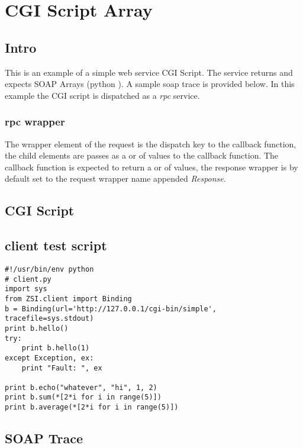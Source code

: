 \chapter{CGI Script Array}

\section{Intro} This is an example of a simple web service CGI Script.  The
service returns and expects SOAP Arrays (python ).  A sample soap
trace is provided below.  In this example the CGI script is dispatched as a
\emph{rpc} service.

\subsection{rpc wrapper} The wrapper element of the request is the dispatch key
to the callback function, the child elements are passes as a  or
 of values to the callback function.  The callback function is
expected to return a  or  of values, the response
wrapper is by default set to the request wrapper name appended \emph{Response}.

\section{CGI Script}



\section{client test script}
\begin{verbatim}
#!/usr/bin/env python
# client.py
import sys
from ZSI.client import Binding
b = Binding(url='http://127.0.0.1/cgi-bin/simple', tracefile=sys.stdout)
print b.hello()
try:
    print b.hello(1)
except Exception, ex:
    print "Fault: ", ex

print b.echo("whatever", "hi", 1, 2)
print b.sum(*[2*i for i in range(5)])
print b.average(*[2*i for i in range(5)])
\end{verbatim}

\section{SOAP Trace}
